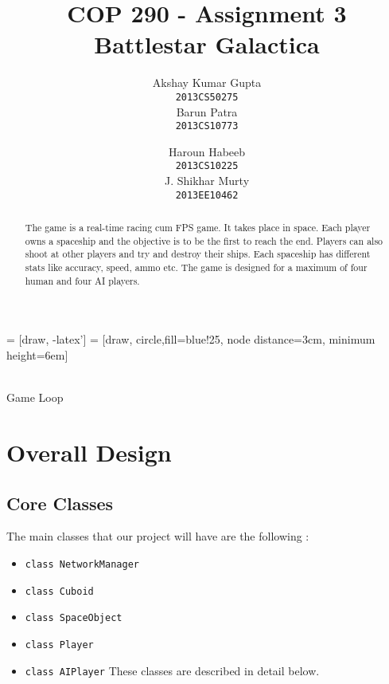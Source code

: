 \documentclass[]{article}
\newcommand{\ty}[1]{\texttt{#1}}
\begin{document}
\title{COP 290 - Assignment 3\\Battlestar Galactica}
\author{Akshay Kumar Gupta\\ \ty{2013CS50275} \\[.1in]  Barun Patra\\ \ty{2013CS10773} \and  Haroun Habeeb\\ \ty{2013CS10225} \\[.1in] J. Shikhar Murty\\ \ty{2013EE10462}}
\date{}
\maketitle
\begin{abstract}
\noindent The game is a real-time racing cum FPS game. It takes place in space. Each player owns a spaceship and the objective is to be the first to reach the end. Players can also shoot at other players and try and destroy their ships. Each spaceship has different stats like accuracy, speed, ammo etc. The game is designed for a maximum of four human and four AI players.
\end{abstract}
 = [draw, -latex']
 = [draw, circle,fill=blue!25, node distance=3cm,
minimum height=6em]
\begin{center}
\\[0.3in]Game Loop
\end{center}
\section{Overall Design}
\subsection{Core Classes}
The main classes that our project will have are the following : 
\begin{itemize}
\item \ty{class NetworkManager}
\item \ty{class Cuboid}
\item \ty{class SpaceObject}
\item \ty{class Player}
\item \ty{class AIPlayer}
These classes are described in detail below.
\end{itemize}
\end{document}
